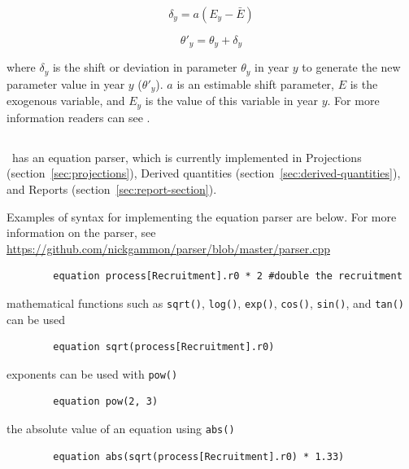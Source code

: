 \begin{equation}
\delta_y = a(E_y - \bar{E})
\end{equation}

\begin{equation}
\theta'_y = \theta_y + \delta_y
\end{equation}

where $\delta_y$ is the shift or deviation in parameter $\theta_y$ in year $y$ to generate the new parameter value in year $y$ ($\theta'_y$). $a$ is an estimable shift parameter, $E$ is the exogenous variable, and $E_y$ is the value of this variable in year $y$. For more information readers can see \cite{francis_03}.

\subsection{\label{sec:eq_parser}}

\CNAME~has an equation parser, which is currently implemented in Projections (section~\ref{sec:projections}), Derived quantities (section~\ref{sec:derived-quantities}), and Reports (section~\ref{sec:report-section}).

Examples of syntax for implementing the equation parser are below. For more information on the parser, see \url{https://github.com/nickgammon/parser/blob/master/parser.cpp}


{\small{\begin{verbatim}
		equation process[Recruitment].r0 * 2 #double the recruitment
		\end{verbatim}}}

mathematical functions such as \texttt{sqrt()}, \texttt{log()},  \texttt{exp()},  \texttt{cos()}, \texttt{sin()}, and \texttt{tan()} can be used

{\small{\begin{verbatim}
		equation sqrt(process[Recruitment].r0)
		\end{verbatim}}}

exponents can be used with \texttt{pow()}

{\small{\begin{verbatim}
		equation pow(2, 3)
		\end{verbatim}}}

the absolute value of an equation using \texttt{abs()}

{\small{\begin{verbatim}
		equation abs(sqrt(process[Recruitment].r0) * 1.33)
		\end{verbatim}}}

